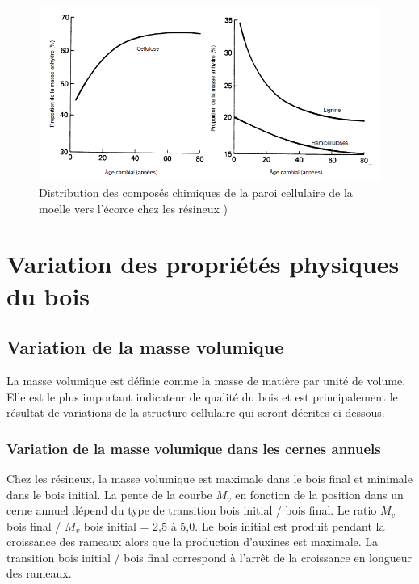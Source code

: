 \begin{figure}[h]
	\centering
	\includegraphics[scale=0.55]{img/ch7_cellulose_moelle}
	\caption{Distribution des composés chimiques de la paroi cellulaire de la moelle vers l'écorce chez les résineux \cite{panshin1980textbook})}
	\label{fig:cellulose_moelle}
\end{figure}


\section{Variation des propriétés physiques du bois}

\subsection{Variation de la masse volumique}

La masse volumique est définie comme la masse de matière par unité de volume. Elle est le plus important indicateur de qualité du bois et est principalement le résultat de variations de la structure cellulaire qui seront décrites ci-dessous.

\subsubsection{Variation de la masse volumique dans les cernes annuels}

Chez les résineux, la masse volumique est maximale dans le bois final et minimale dans le bois initial. La pente de la courbe $M_v$ en fonction de la position dans un cerne annuel dépend du type de transition bois initial / bois final. Le ratio $M_v$ bois final / $M_v$ bois initial = 2,5 à 5,0. Le bois initial est produit pendant la croissance des rameaux alors que la production d'auxines est maximale.  La transition bois initial / bois final correspond à l'arrêt de la croissance en longueur des rameaux.\\

